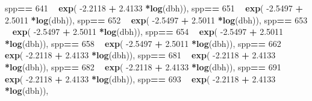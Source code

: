 \documentclass[
]{article}
\newenvironment{Shaded}{\begin{snugshade}}{\end{snugshade}}
\newcommand{\DecValTok}[1]{\textcolor[rgb]{0.00,0.00,0.81}{#1}}
\newcommand{\FloatTok}[1]{\textcolor[rgb]{0.00,0.00,0.81}{#1}}
\newcommand{\KeywordTok}[1]{\textcolor[rgb]{0.13,0.29,0.53}{\textbf{#1}}}
\newcommand{\NormalTok}[1]{#1}
\newcommand{\OperatorTok}[1]{\textcolor[rgb]{0.81,0.36,0.00}{\textbf{#1}}}
\newcommand{\StringTok}[1]{\textcolor[rgb]{0.31,0.60,0.02}{#1}}
\begin{document}
\begin{Shaded}
\begin{Highlighting}[]
\NormalTok{    spp}\OperatorTok{==}\StringTok{ }\DecValTok{641} \OperatorTok{~}\StringTok{ }\KeywordTok{exp}\NormalTok{( }\FloatTok{-2.2118}   \OperatorTok{+}\StringTok{    }\FloatTok{2.4133} \OperatorTok{*}\KeywordTok{log}\NormalTok{(dbh)),}
\NormalTok{    spp}\OperatorTok{==}\StringTok{ }\DecValTok{651} \OperatorTok{~}\StringTok{ }\KeywordTok{exp}\NormalTok{( }\FloatTok{-2.5497}   \OperatorTok{+}\StringTok{    }\FloatTok{2.5011} \OperatorTok{*}\KeywordTok{log}\NormalTok{(dbh)),}
\NormalTok{    spp}\OperatorTok{==}\StringTok{ }\DecValTok{652} \OperatorTok{~}\StringTok{ }\KeywordTok{exp}\NormalTok{( }\FloatTok{-2.5497}   \OperatorTok{+}\StringTok{    }\FloatTok{2.5011} \OperatorTok{*}\KeywordTok{log}\NormalTok{(dbh)),}
\NormalTok{    spp}\OperatorTok{==}\StringTok{ }\DecValTok{653} \OperatorTok{~}\StringTok{ }\KeywordTok{exp}\NormalTok{( }\FloatTok{-2.5497}   \OperatorTok{+}\StringTok{    }\FloatTok{2.5011} \OperatorTok{*}\KeywordTok{log}\NormalTok{(dbh)),}
\NormalTok{    spp}\OperatorTok{==}\StringTok{ }\DecValTok{654} \OperatorTok{~}\StringTok{ }\KeywordTok{exp}\NormalTok{( }\FloatTok{-2.5497}   \OperatorTok{+}\StringTok{    }\FloatTok{2.5011} \OperatorTok{*}\KeywordTok{log}\NormalTok{(dbh)),}
\NormalTok{    spp}\OperatorTok{==}\StringTok{ }\DecValTok{658} \OperatorTok{~}\StringTok{ }\KeywordTok{exp}\NormalTok{( }\FloatTok{-2.5497}   \OperatorTok{+}\StringTok{    }\FloatTok{2.5011} \OperatorTok{*}\KeywordTok{log}\NormalTok{(dbh)),}
\NormalTok{    spp}\OperatorTok{==}\StringTok{ }\DecValTok{662} \OperatorTok{~}\StringTok{ }\KeywordTok{exp}\NormalTok{( }\FloatTok{-2.2118}   \OperatorTok{+}\StringTok{    }\FloatTok{2.4133} \OperatorTok{*}\KeywordTok{log}\NormalTok{(dbh)),}
\NormalTok{    spp}\OperatorTok{==}\StringTok{ }\DecValTok{681} \OperatorTok{~}\StringTok{ }\KeywordTok{exp}\NormalTok{( }\FloatTok{-2.2118}   \OperatorTok{+}\StringTok{    }\FloatTok{2.4133} \OperatorTok{*}\KeywordTok{log}\NormalTok{(dbh)),}
\NormalTok{    spp}\OperatorTok{==}\StringTok{ }\DecValTok{682} \OperatorTok{~}\StringTok{ }\KeywordTok{exp}\NormalTok{( }\FloatTok{-2.2118}   \OperatorTok{+}\StringTok{    }\FloatTok{2.4133} \OperatorTok{*}\KeywordTok{log}\NormalTok{(dbh)),}
\NormalTok{    spp}\OperatorTok{==}\StringTok{ }\DecValTok{691} \OperatorTok{~}\StringTok{ }\KeywordTok{exp}\NormalTok{( }\FloatTok{-2.2118}   \OperatorTok{+}\StringTok{    }\FloatTok{2.4133} \OperatorTok{*}\KeywordTok{log}\NormalTok{(dbh)),}
\NormalTok{    spp}\OperatorTok{==}\StringTok{ }\DecValTok{693} \OperatorTok{~}\StringTok{ }\KeywordTok{exp}\NormalTok{( }\FloatTok{-2.2118}   \OperatorTok{+}\StringTok{    }\FloatTok{2.4133} \OperatorTok{*}\KeywordTok{log}\NormalTok{(dbh)),}

\end{Highlighting}
\end{Shaded}
\end{document}
